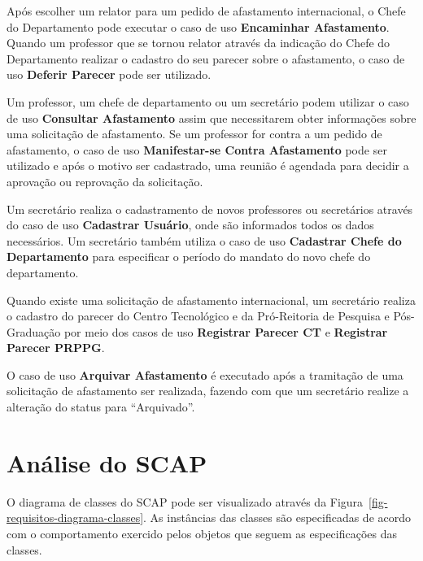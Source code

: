 Após escolher um relator para um pedido de afastamento internacional, o Chefe do Departamento pode executar o caso de uso \textbf{Encaminhar Afastamento}. Quando um professor que se tornou relator através da indicação do Chefe do Departamento realizar o cadastro do seu parecer sobre o afastamento, o caso de uso \textbf{Deferir Parecer} pode ser utilizado.

Um professor, um chefe de departamento ou um secretário podem utilizar o caso de uso \textbf{Consultar Afastamento} assim que necessitarem obter informações sobre uma solicitação de afastamento. Se um professor for contra a um pedido de afastamento, o caso de uso \textbf{Manifestar-se Contra Afastamento} pode ser utilizado e após o motivo ser cadastrado, uma reunião é agendada para decidir a aprovação ou reprovação da solicitação.

Um secretário realiza o cadastramento de novos professores ou secretários através do caso de uso \textbf{Cadastrar Usuário}, onde são informados todos os dados necessários. Um secretário também utiliza o caso de uso \textbf{Cadastrar Chefe do Departamento} para especificar o período do mandato do novo chefe do departamento.
  
Quando existe uma solicitação de afastamento internacional, um secretário realiza o cadastro do parecer do Centro Tecnológico e da Pró-Reitoria de Pesquisa e Pós-Graduação por meio dos casos de uso \textbf{Registrar Parecer CT} e \textbf{Registrar Parecer PRPPG}.

O caso de uso \textbf{Arquivar Afastamento} é executado após a tramitação de uma solicitação de afastamento ser realizada, fazendo com que um secretário realize a alteração do status para ``Arquivado''.   

\section{Análise do SCAP}
\label{sec-requisitos-analise-scap}

O diagrama de classes do SCAP pode ser visualizado através da Figura~\ref{fig-requisitos-diagrama-classes}. As instâncias das classes são especificadas de acordo com o comportamento exercido pelos objetos que seguem as especificações das classes. 

